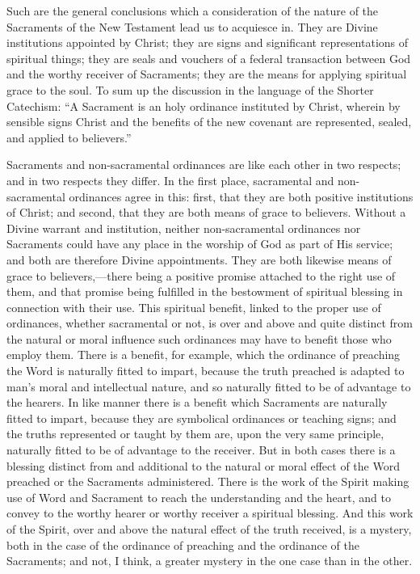 \documentclass[]{book}
\begin{document}
Such are the general conclusions which a consideration of the nature of the Sacraments of the New Testament lead us to acquiesce in. They are Divine institutions appointed by Christ; they are signs and significant representations of spiritual things; they are seals and vouchers of a federal transaction between God and the worthy receiver of Sacraments; they are the means for applying spiritual grace to the soul. To sum up the discussion in the language of the Shorter Catechism: ``A Sacrament is an holy ordinance instituted by Christ, wherein by sensible signs Christ and the benefits of the new covenant are represented, sealed, and applied to believers.''

Sacraments and non-sacramental ordinances are like each other in two respects; and in two respects they differ. In the first place, sacramental and non-sacramental ordinances agree in this: first, that they are both positive institutions of Christ; and second, that they are both means of grace to believers. Without a Divine warrant and institution, neither non-sacramental ordinances nor Sacraments could have any place in the worship of God as part of His service; and both are therefore Divine appointments. They are both likewise means of grace to believers,---there being a positive promise attached to the right use of them, and that promise being fulfilled in the bestowment of spiritual blessing in connection with their use. This spiritual benefit, linked to the proper use of ordinances, whether sacramental or not, is over and above and quite distinct from the natural or moral influence such ordinances may have to benefit those who employ them. There is a benefit, for example, which the ordinance of preaching the Word is naturally fitted to impart, because the truth preached is adapted to man's moral and intellectual nature, and so naturally fitted to be of advantage to the hearers. In like manner there is a benefit which Sacraments are naturally fitted to impart, because they are symbolical ordinances or teaching signs; and the truths represented or taught by them are, upon the very same principle, naturally fitted to be of advantage to the receiver. But in both cases there is a blessing distinct from and additional to the natural or moral effect of the Word preached or the Sacraments administered. There is the work of the Spirit making use of Word and Sacrament to reach the understanding and the heart, and to convey to the worthy hearer or worthy receiver a spiritual blessing. And this work of the Spirit, over and above the natural effect of the truth received, is a mystery, both in the case of the ordinance of preaching and the ordinance of the Sacraments; and not, I think, a greater mystery in the one case than in the other.
\end{document}
